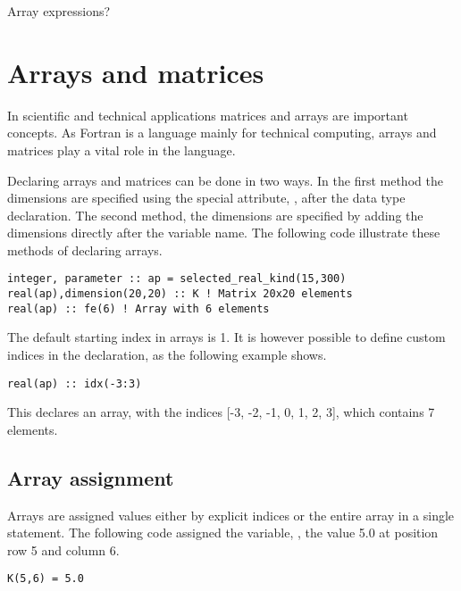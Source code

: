 Array expressions?


\section{Arrays and matrices}

In scientific and technical applications matrices and arrays are important concepts. As Fortran is a language mainly for
technical computing, arrays and matrices play a vital role in the language.

Declaring arrays and matrices can be done in two ways. In the first method the dimensions are specified using the special attribute, , after the data type declaration. The second method, the dimensions are specified by adding the dimensions directly after the variable name. The following code illustrate these methods of declaring arrays.

\begin{lstlisting}
integer, parameter :: ap = selected_real_kind(15,300)
real(ap),dimension(20,20) :: K ! Matrix 20x20 elements
real(ap) :: fe(6) ! Array with 6 elements
\end{lstlisting}

The default starting index in arrays is 1. It is however possible to define custom indices in the declaration, as the following example shows.

\begin{lstlisting}
real(ap) :: idx(-3:3)
\end{lstlisting}

This declares an array,  with the indices [-3, -2,
-1, 0, 1, 2, 3], which contains 7 elements.

\subsection{Array assignment}

Arrays are assigned values either by explicit indices or the entire array in a single statement. The following code assigned the variable, , the value 5.0 at position row 5 and column 6.

\begin{lstlisting}
K(5,6) = 5.0
\end{lstlisting}

